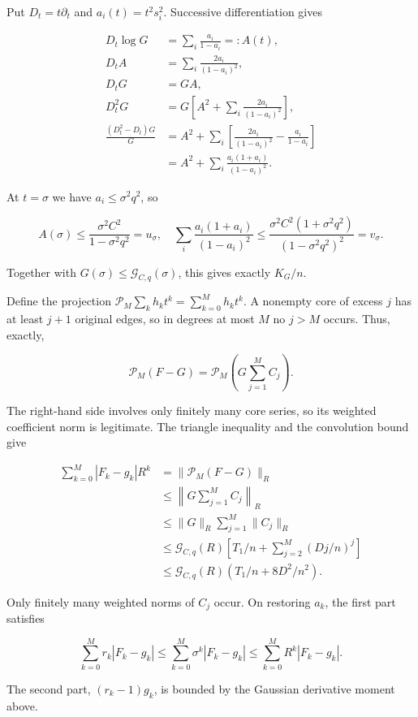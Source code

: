\documentclass[11pt,a4paper]{article}
\begin{document}
Put \(D_t=t\partial_t\) and \(a_i(t)=t^2s_i^2\). Successive differentiation gives

\[
\begin{aligned}
D_t\log G&=\sum_i\frac{a_i}{1-a_i}=:A(t),\\
D_tA&=\sum_i\frac{2a_i}{(1-a_i)^2},\\
D_tG&=GA,\\
D_t^2G&=G\left[A^2+\sum_i\frac{2a_i}{(1-a_i)^2}\right],\\
\frac{(D_t^2-D_t)G}{G}
&=A^2+\sum_i\left[\frac{2a_i}{(1-a_i)^2}-\frac{a_i}{1-a_i}\right]\\
&=A^2+\sum_i\frac{a_i(1+a_i)}{(1-a_i)^2}.
\end{aligned}
\]

At \(t=\sigma\) we have \(a_i\le\sigma^2q^2\), so

\[
A(\sigma)\le\frac{\sigma^2C^2}{1-\sigma^2q^2}=u_\sigma,
\quad
\sum_i\frac{a_i(1+a_i)}{(1-a_i)^2}
\le\frac{\sigma^2C^2(1+\sigma^2q^2)}{(1-\sigma^2q^2)^2}=v_\sigma.
\]

Together with \(G(\sigma)\le\mathcal G_{C,q}(\sigma)\), this gives exactly \(K_G/n\).

Define the projection \(\mathcal P_M\sum_kh_kt^k=\sum_{k=0}^Mh_kt^k\). A nonempty core of excess \(j\) has at least \(j+1\) original edges, so in degrees at most \(M\) no \(j>M\) occurs. Thus, exactly,

\[
\mathcal P_M(F-G)=\mathcal P_M\left(G\sum_{j=1}^MC_j\right).
\]

The right-hand side involves only finitely many core series, so its weighted coefficient norm is legitimate. The triangle inequality and the convolution bound give

\[
\begin{aligned}
\sum_{k=0}^M|F_k-g_k|R^k
&=\|\mathcal P_M(F-G)\|_R\\
&\le\left\|G\sum_{j=1}^MC_j\right\|_R\\
&\le\|G\|_R\sum_{j=1}^M\|C_j\|_R\\
&\le\mathcal G_{C,q}(R)\left[T_1/n+\sum_{j=2}^M(Dj/n)^j\right]\\
&\le\mathcal G_{C,q}(R)(T_1/n+8D^2/n^2).
\end{aligned}
\]

Only finitely many weighted norms of \(C_j\) occur. On restoring \(a_k\), the first part satisfies

\[
\sum_{k=0}^Mr_k|F_k-g_k|
\le\sum_{k=0}^M\sigma^k|F_k-g_k|
\le\sum_{k=0}^MR^k|F_k-g_k|.
\]

The second part, \((r_k-1)g_k\), is bounded by the Gaussian derivative moment above.
\end{document}
